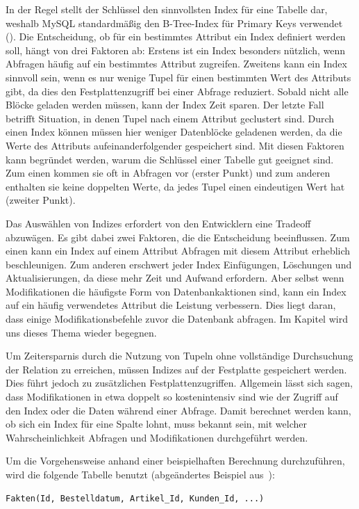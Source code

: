 In der Regel stellt der Schlüssel den sinnvollsten Index für eine Tabelle dar, weshalb MySQL standardmäßig den B-Tree-Index für Primary Keys verwendet (\cite{mysql_primary_key}).
Die Entscheidung, ob für ein bestimmtes Attribut ein Index definiert werden soll, hängt von drei Faktoren ab:
Erstens ist ein Index besonders nützlich, wenn Abfragen häufig auf ein bestimmtes Attribut zugreifen.
Zweitens kann ein Index sinnvoll sein, wenn es nur wenige Tupel für einen bestimmten Wert des Attributs gibt, da dies den Festplattenzugriff bei einer Abfrage reduziert.
Sobald nicht alle Blöcke geladen werden müssen, kann der Index Zeit sparen.
Der letzte Fall betrifft Situation, in denen Tupel nach einem Attribut geclustert sind.
Durch einen Index können müssen hier weniger Datenblöcke geladenen werden, da die Werte des Attributs aufeinanderfolgender gespeichert sind.
Mit diesen Faktoren kann begründet werden, warum die Schlüssel einer Tabelle gut geeignet sind.
Zum einen kommen sie oft in Abfragen vor (erster Punkt) und zum anderen enthalten sie keine doppelten Werte, da jedes Tupel einen eindeutigen Wert hat (zweiter Punkt).

Das Auswählen von Indizes erfordert von den Entwicklern eine Tradeoff abzuwägen.
Es gibt dabei zwei Faktoren, die die Entscheidung beeinflussen.
Zum einen kann ein Index auf einem Attribut Abfragen mit diesem Attribut erheblich beschleunigen.
Zum anderen erschwert jeder Index Einfügungen, Löschungen und Aktualisierungen, da diese mehr Zeit und Aufwand erfordern.
Aber selbst wenn Modifikationen die häufigste Form von Datenbankaktionen sind, kann ein Index auf ein häufig verwendetes Attribut die Leistung verbessern.
Dies liegt daran, dass einige Modifikationsbefehle zuvor die Datenbank abfragen.
Im Kapitel  wird uns dieses Thema wieder begegnen.

Um Zeitersparnis durch die Nutzung von Tupeln ohne vollständige Durchsuchung der Relation zu erreichen, müssen Indizes auf der Festplatte gespeichert werden.
Dies führt jedoch zu zusätzlichen Festplattenzugriffen.
Allgemein lässt sich sagen, dass Modifikationen in etwa doppelt so kostenintensiv sind wie der Zugriff auf den Index oder die Daten während einer Abfrage.
Damit berechnet werden kann, ob sich ein Index für eine Spalte lohnt, muss bekannt sein, mit welcher Wahrscheinlichkeit Abfragen und Modifikationen durchgeführt werden.

Um die Vorgehensweise anhand einer beispielhaften Berechnung durchzuführen, wird die folgende Tabelle benutzt (abgeändertes Beispiel aus~\cite[S. 355--357]{garcia2008database}):
\vspace{-4pt}
\begin{lstlisting}
Fakten(Id, Bestelldatum, Artikel_Id, Kunden_Id, ...)
\end{lstlisting}
\vspace{-8pt}

